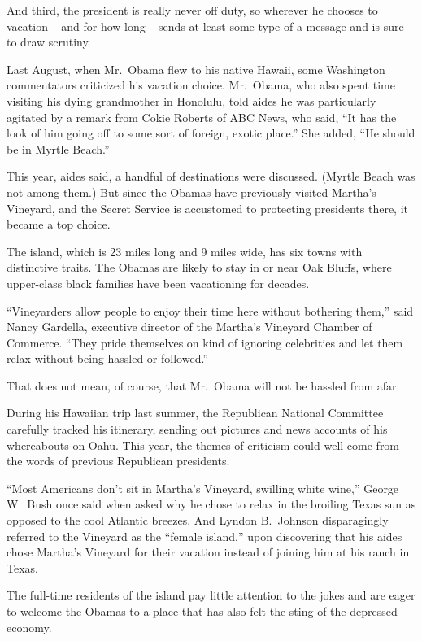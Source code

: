 ﻿\documentclass[12pt]{article}
\begin{document}
And third, the president is really never off duty, so wherever he chooses to vacation -- and for how
long -- sends at least some type of a message and is sure to draw scrutiny.

Last August, when Mr.~Obama flew to his native Hawaii, some Washington commentators criticized his
vacation choice. Mr.~Obama, who also spent time visiting his dying grandmother in Honolulu, told
aides he was particularly agitated by a remark from Cokie Roberts of ABC News, who said, ``It has
the look of him going off to some sort of foreign, exotic place.'' She added, ``He should be in
Myrtle Beach.''

This year, aides said, a handful of destinations were discussed. (Myrtle Beach was not among them.)
But since the Obamas have previously visited Martha's Vineyard, and the Secret Service is accustomed
to protecting presidents there, it became a top choice.

The island, which is 23 miles long and 9 miles wide, has six towns with distinctive traits. The
Obamas are likely to stay in or near Oak Bluffs, where upper-class black families have been
vacationing for decades.

``Vineyarders allow people to enjoy their time here without bothering them,'' said Nancy Gardella,
executive director of the Martha's Vineyard Chamber of Commerce. ``They pride themselves on kind of
ignoring celebrities and let them relax without being hassled or followed.''

That does not mean, of course, that Mr.~Obama will not be hassled from afar.

During his Hawaiian trip last summer, the Republican National Committee carefully tracked his
itinerary, sending out pictures and news accounts of his whereabouts on Oahu. This year, the themes
of criticism could well come from the words of previous Republican presidents.

``Most Americans don't sit in Martha's Vineyard, swilling white wine,'' George W.~Bush once said
when asked why he chose to relax in the broiling Texas sun as opposed to the cool Atlantic breezes.
And Lyndon B.~Johnson disparagingly referred to the Vineyard as the ``female island,'' upon
discovering that his aides chose Martha's Vineyard for their vacation instead of joining him at his
ranch in Texas.

The full-time residents of the island pay little attention to the jokes and are eager to welcome the
Obamas to a place that has also felt the sting of the depressed economy.
\end{document}

